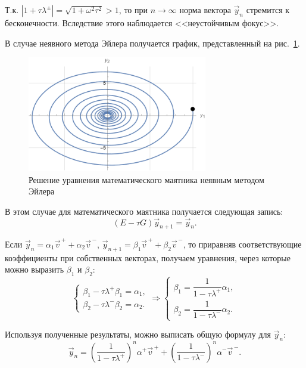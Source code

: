\documentclass[12pt, a4paper]{article}
\begin{document}
	Т.к. $|1+\tau \lambda^\pm| = \sqrt{1+ \omega^2 \tau^2} > 1$, то при $n \rightarrow \infty$ норма вектора $\vec{y}_n$ стремится к бесконечности. Вследствие этого наблюдается <<неустойчивым фокус>>.
	
	В случае неявного метода Эйлера получается график, представленный на рис.~\ref{euler_impl_pend}.
	
	\begin{figure}[!h]
		\centering
		\includegraphics[width=0.7\textwidth]{euler_impl_pend}
		\caption{Решение уравнения математического маятника неявным методом Эйлера}
		\label{euler_impl_pend}
	\end{figure}
	
	В этом случае для математического маятника получается следующая запись:
	\[
	(E-\tau G) \vec{y}_{n+1} = \vec{y}_n.
	\]
	
	Если $\vec{y}_n = \alpha_1 \vec{v}^{\,+} + \alpha_2 \vec{v}^{\,-}$, $\vec{y}_{n+1} = \beta_1 \vec{v}^{\,+} + \beta_2 \vec{v}^{\,-}$, то приравняв соответствующие коэффициенты при собственных векторах, получаем уравнения, через которые можно выразить $\beta_1$ и $\beta_2$:
	\begin{equation*}
		\begin{cases}
			\beta_1 - \tau \lambda^+ \beta_1 = \alpha_1,\\
			\beta_2 - \tau \lambda^- \beta_2 = \alpha_2.
		\end{cases} \Rightarrow
		\begin{cases}
			\beta_1 = \dfrac1{1 - \tau \lambda^+} \alpha_1,\\
			\beta_2 = \dfrac1{1 - \tau \lambda^-} \alpha_2.
		\end{cases}
	\end{equation*}
	
	Используя полученные результаты, можно выписать общую формулу для $\vec{y}_n$:
	\begin{equation*}
		\vec{y}_n = \left(\dfrac1{1 - \tau \lambda^+}\right)^n \alpha^+ \vec{v}^{\,+} + \left(\dfrac1{1 - \tau \lambda^-}\right)^n \alpha^- \vec{v}^{\,-}.
	\end{equation*}
	
\end{document}
